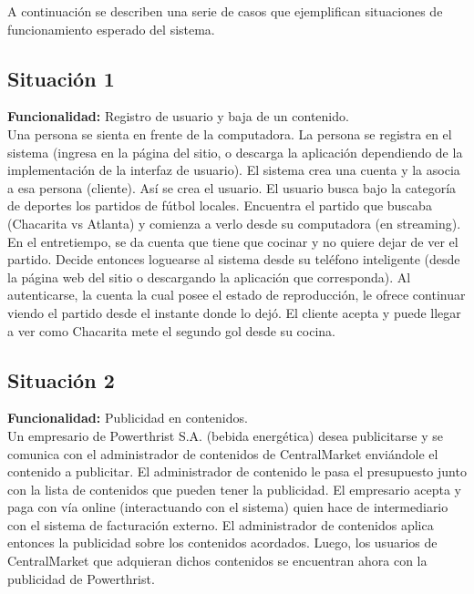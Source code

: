 \documentclass[11pt, a4paper, spanish]{article}
\begin{document}
	A continuaci\'on se describen una serie de casos que ejemplifican situaciones de funcionamiento esperado del sistema.

\subsection{Situaci\'on 1}

	\textbf{Funcionalidad:} Registro de usuario y baja de un contenido.\\

        Una persona se sienta en frente de la computadora.
    La persona se registra en el sistema (ingresa en la p\'agina del sitio, o descarga 
    la aplicaci\'on dependiendo de la implementaci\'on  de la interfaz de usuario).
    El sistema crea una cuenta y la asocia a esa persona (cliente). As\'i se crea el usuario.
    El usuario busca bajo la categor\'ia de deportes los partidos de f\'utbol locales.
    Encuentra el partido que buscaba (Chacarita vs Atlanta) y comienza a verlo desde su computadora (en streaming).\\

        En el entretiempo, se da cuenta que tiene que cocinar y no quiere dejar de ver el partido. Decide entonces loguearse al sistema desde su 
    tel\'efono inteligente (desde la p\'agina web del sitio o descargando la aplicaci\'on que corresponda). 
    Al autenticarse, la cuenta la cual posee el estado de reproducci\'on, le ofrece continuar viendo el partido desde el instante donde lo dej\'o.
    El cliente acepta y puede llegar a ver como Chacarita mete el segundo gol desde su cocina.

\subsection{Situaci\'on 2}

	\textbf{Funcionalidad:} Publicidad en contenidos.\\

        Un empresario de Powerthrist S.A. (bebida energ\'etica) desea publicitarse y se comunica con el administrador de contenidos de CentralMarket 
    envi\'andole el contenido a publicitar.
    El administrador de contenido le pasa el presupuesto junto con la lista de contenidos que pueden tener la publicidad.
    El empresario acepta y paga con v\'ia online (interactuando con el sistema) quien hace de intermediario con el sistema de facturaci\'on externo.
    El administrador de contenidos aplica entonces la publicidad sobre los contenidos acordados.
    Luego, los usuarios de CentralMarket que adquieran dichos contenidos se encuentran ahora con la publicidad de Powerthrist.
\end{document}
